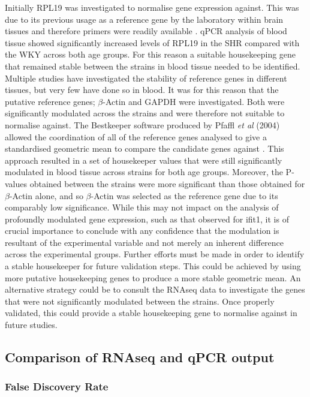 Initially RPL19 was investigated to normalise gene expression against. This was due to its previous usage as a reference gene by the laboratory within brain tissues and therefore primers were readily available \cite{Greenwood2015}. qPCR analysis of blood tissue showed significantly increased levels of RPL19 in the SHR compared with the WKY across both age groups. For this reason a suitable housekeeping gene that remained stable between the strains in blood tissue needed to be identified. Multiple studies have investigated the stability of reference genes in different tissues, but very few have done so in blood. It was for this reason that the putative reference genes; $\beta$-Actin and GAPDH were investigated. Both were significantly modulated across the strains and were therefore not suitable to normalise against. The Bestkeeper software produced by Pfaffl \textit{et al} (2004) allowed the coordination of all of the reference genes analysed to give a standardised geometric mean to compare the candidate genes against \cite{Pfaffl2004}. This approach resulted in a set of housekeeper values that were still significantly modulated in blood tissue across strains for both age groups. Moreover, the P-values obtained between the strains were more significant than those obtained for $\beta$-Actin alone, and so $\beta$-Actin was selected as the reference gene due to its comparably low significance. While this may not impact on the analysis of profoundly modulated gene expression, such as that observed for ifit1, it is of crucial importance to conclude with any confidence that the modulation is resultant of the experimental variable and not merely an inherent difference across the experimental groups.  Further efforts must be made in order to identify a stable housekeeper for future validation steps. This could be achieved by using more putative housekeeping genes to produce a more stable geometric mean. An alternative strategy could be to consult the RNAseq data to investigate the genes that were not significantly modulated between the strains. Once properly validated, this could provide a stable housekeeping gene to normalise against in future studies. 


\subsection{Comparison of RNAseq and qPCR output} \label{Comparison of RNAseq and qPCR output}
\subsubsection{False Discovery Rate} \label{False Discovery Rate}

